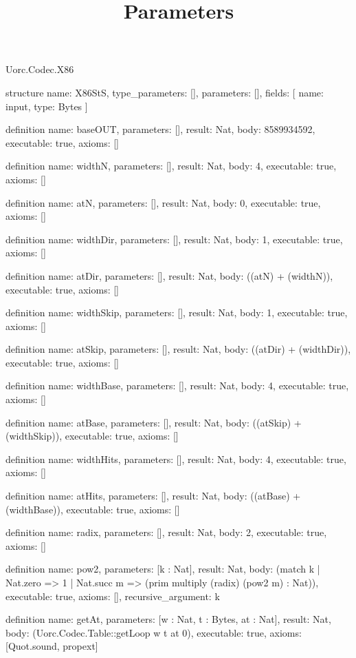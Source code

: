 \begin{lexlean}{Uorc.Codec.X86}
\title{Parameters}
\begin{semanticmodule}
structure{
  name: X86StS,
  type_parameters: [],
  parameters: [],
  fields: [
    {name: input, type: Bytes}
  ]
}

definition{
  name: baseOUT,
  parameters: [],
  result: Nat,
  body: 8589934592,
  executable: true,
  axioms: []
}

definition{
  name: widthN,
  parameters: [],
  result: Nat,
  body: 4,
  executable: true,
  axioms: []
}

definition{
  name: atN,
  parameters: [],
  result: Nat,
  body: 0,
  executable: true,
  axioms: []
}

definition{
  name: widthDir,
  parameters: [],
  result: Nat,
  body: 1,
  executable: true,
  axioms: []
}

definition{
  name: atDir,
  parameters: [],
  result: Nat,
  body: ((atN) + (widthN)),
  executable: true,
  axioms: []
}

definition{
  name: widthSkip,
  parameters: [],
  result: Nat,
  body: 1,
  executable: true,
  axioms: []
}

definition{
  name: atSkip,
  parameters: [],
  result: Nat,
  body: ((atDir) + (widthDir)),
  executable: true,
  axioms: []
}

definition{
  name: widthBase,
  parameters: [],
  result: Nat,
  body: 4,
  executable: true,
  axioms: []
}

definition{
  name: atBase,
  parameters: [],
  result: Nat,
  body: ((atSkip) + (widthSkip)),
  executable: true,
  axioms: []
}

definition{
  name: widthHits,
  parameters: [],
  result: Nat,
  body: 4,
  executable: true,
  axioms: []
}

definition{
  name: atHits,
  parameters: [],
  result: Nat,
  body: ((atBase) + (widthBase)),
  executable: true,
  axioms: []
}

definition{
  name: radix,
  parameters: [],
  result: Nat,
  body: 2,
  executable: true,
  axioms: []
}

definition{
  name: pow2,
  parameters: [k : Nat],
  result: Nat,
  body: (match k
    | Nat.zero => 1
    | Nat.succ m => (prim multiply (radix) (pow2 m) : Nat)),
  executable: true,
  axioms: [],
  recursive_argument: k
}

definition{
  name: getAt,
  parameters: [w : Nat, t : Bytes, at : Nat],
  result: Nat,
  body: (Uorc.Codec.Table::getLoop w t at 0),
  executable: true,
  axioms: [Quot.sound, propext]
}


\end{semanticmodule}
\end{lexlean}
